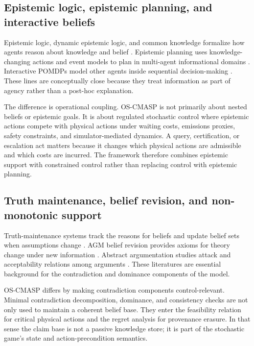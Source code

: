 \documentclass[11pt]{article}
\newcommand{\OSCMASP}{\mbox{\normalfont\textsc{OS-CMASP}}}
\newcommand{\1}{\mathbf{1}}
\theoremstyle{definition}
\theoremstyle{plain}
\theoremstyle{remark}
\begin{document}
\subsection{Epistemic logic, epistemic planning, and interactive beliefs}

Epistemic logic, dynamic epistemic logic, and common knowledge formalize how agents reason about knowledge and belief \citep{Fagin1995,HalpernMoses1990,vanDitmarsch2007,Baltag1998}. Epistemic planning uses knowledge-changing actions and event models to plan in multi-agent informational domains \citep{BolanderAndersen2011,Bolander2017Gentle,LiuLiu2018MEP,Liberman2020TermModal}. Interactive POMDPs model other agents inside sequential decision-making \citep{GmytrasiewiczDoshi2005}. These lines are conceptually close because they treat information as part of agency rather than a post-hoc explanation.

The difference is operational coupling. \OSCMASP{} is not primarily about nested beliefs or epistemic goals. It is about regulated stochastic control where epistemic actions compete with physical actions under waiting costs, emissions proxies, safety constraints, and simulator-mediated dynamics. A query, certification, or escalation act matters because it changes which physical actions are admissible and which costs are incurred. The framework therefore combines epistemic support with constrained control rather than replacing control with epistemic planning.

\subsection{Truth maintenance, belief revision, and non-monotonic support}

Truth-maintenance systems track the reasons for beliefs and update belief sets when assumptions change \citep{Doyle1979,deKleer1986,McAllester1990TMS}. AGM belief revision provides axioms for theory change under new information \citep{AGM1985}. Abstract argumentation studies attack and acceptability relations among arguments \citep{Dung1995Argumentation}. These literatures are essential background for the contradiction and dominance components of the model.

\OSCMASP{} differs by making contradiction components control-relevant. Minimal contradiction decomposition, dominance, and consistency checks are not only used to maintain a coherent belief base. They enter the feasibility relation for critical physical actions and the regret analysis for provenance erasure. In that sense the claim base is not a passive knowledge store; it is part of the stochastic game's state and action-precondition semantics.
\end{document}
